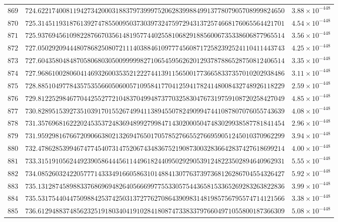 \documentclass[12pt,reqno]{amsart}
\theoremstyle{remark}
\begin{document}
\begin{longtable}{clc}
$869$ & $724.6221740081194273420003188379739997520628399884991377807905708999824650$ & $3.88\times 10^{-448}$ \\
$870$ & $725.3145119318761392747855009503730397324759729431372574668176065564421701$ & $4.54\times 10^{-448}$ \\
$871$ & $725.9376945610982287667035614819577440255810682918856006735338606877965514$ & $3.56\times 10^{-448}$ \\
$872$ & $727.0502920944480786825080721114038846109777456087172582392524110411443743$ & $4.25\times 10^{-448}$ \\
$873$ & $727.6043580484870580680305009999982710654595626201293787886528750812406514$ & $3.35\times 10^{-448}$ \\
$874$ & $727.9686100280604146932600353521222744139115650017736658337357010202938486$ & $3.11\times 10^{-448}$ \\
$875$ & $728.8851049778435753556605060057109584177041259417824148008432748926118229$ & $2.59\times 10^{-448}$ \\
$876$ & $729.8122529846770442552772104837049948737703258304767319759108720258427049$ & $4.85\times 10^{-448}$ \\
$877$ & $730.8289515392735103917015526749941138945507824909947441087807076055743639$ & $4.08\times 10^{-448}$ \\
$878$ & $731.3576968162220245353724836948992799847143020005047483029938587781841454$ & $2.96\times 10^{-448}$ \\
$879$ & $731.9592981676672090663802132694765017057852766552766959051245010370962299$ & $3.94\times 10^{-448}$ \\
$880$ & $732.4786285399467477454073147520674348367521908730032836642837427618699214$ & $4.00\times 10^{-448}$ \\
$881$ & $733.3151910562449239058644456114496182440950292905391248223502894640962931$ & $5.55\times 10^{-448}$ \\
$882$ & $734.0852603242205777143334916605863101488413077637397368126286704554326427$ & $5.92\times 10^{-448}$ \\
$883$ & $735.1312874589883376869694826405666997755330575443658153365269283263822836$ & $3.99\times 10^{-448}$ \\
$884$ & $735.5317544044750988425374250313727762708643909831481985756795574714121566$ & $3.38\times 10^{-448}$ \\
$885$ & $736.6129488374856232519180340419102841808747338337976604971055800187366309$ & $5.08\times 10^{-448}$ \\

\end{longtable}
\end{document}
